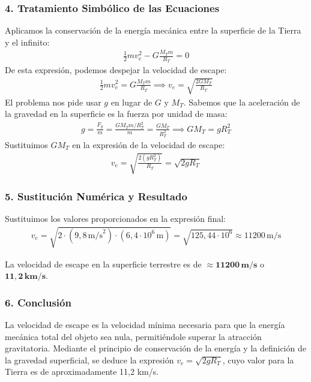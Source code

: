 \subsubsection*{4. Tratamiento Simbólico de las Ecuaciones}
Aplicamos la conservación de la energía mecánica entre la superficie de la Tierra y el infinito:
\begin{gather}
    \frac{1}{2}mv_e^2 - G\frac{M_T m}{R_T} = 0
\end{gather}
De esta expresión, podemos despejar la velocidad de escape:
\begin{gather}
    \frac{1}{2}mv_e^2 = G\frac{M_T m}{R_T} \implies v_e = \sqrt{\frac{2GM_T}{R_T}}
\end{gather}
El problema nos pide usar $g$ en lugar de $G$ y $M_T$. Sabemos que la aceleración de la gravedad en la superficie es la fuerza por unidad de masa:
\begin{gather}
    g = \frac{F_g}{m} = \frac{G M_T m / R_T^2}{m} = \frac{GM_T}{R_T^2} \implies GM_T = g R_T^2
\end{gather}
Sustituimos $GM_T$ en la expresión de la velocidad de escape:
\begin{gather}
    v_e = \sqrt{\frac{2(g R_T^2)}{R_T}} = \sqrt{2gR_T}
\end{gather}

\subsubsection*{5. Sustitución Numérica y Resultado}
Sustituimos los valores proporcionados en la expresión final:
\begin{gather}
    v_e = \sqrt{2 \cdot (9,8 \, \text{m/s}^2) \cdot (6,4 \cdot 10^6 \, \text{m})} = \sqrt{125,44 \cdot 10^6} \approx 11200 \, \text{m/s}
\end{gather}
\begin{cajaresultado}
    La velocidad de escape en la superficie terrestre es de $\boldsymbol{\approx 11200 \, \textbf{m/s}}$ o $\boldsymbol{11,2 \, \textbf{km/s}}$.
\end{cajaresultado}

\subsubsection*{6. Conclusión}
\begin{cajaconclusion}
La velocidad de escape es la velocidad mínima necesaria para que la energía mecánica total del objeto sea nula, permitiéndole superar la atracción gravitatoria. Mediante el principio de conservación de la energía y la definición de la gravedad superficial, se deduce la expresión $v_e = \sqrt{2gR_T}$, cuyo valor para la Tierra es de aproximadamente 11,2 km/s.
\end{cajaconclusion}

